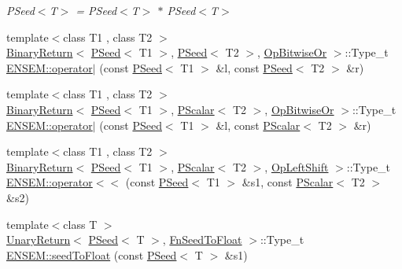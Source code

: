 \begin{DoxyCompactItemize}
\begin{DoxyCompactList}\small\item\em P\+Seed$<$\+T$>$ = P\+Seed$<$\+T$>$ $\ast$ P\+Seed$<$\+T$>$ \end{DoxyCompactList}\item 
{\footnotesize template$<$class T1 , class T2 $>$ }\\\mbox{\hyperlink{structENSEM_1_1BinaryReturn}{Binary\+Return}}$<$ \mbox{\hyperlink{classENSEM_1_1PSeed}{P\+Seed}}$<$ T1 $>$, \mbox{\hyperlink{classENSEM_1_1PSeed}{P\+Seed}}$<$ T2 $>$, \mbox{\hyperlink{structENSEM_1_1OpBitwiseOr}{Op\+Bitwise\+Or}} $>$\+::Type\+\_\+t \mbox{\hyperlink{group__primseed_gafffac24485a71eb45df5a8073ab12746}{E\+N\+S\+E\+M\+::operator$\vert$}} (const \mbox{\hyperlink{classENSEM_1_1PSeed}{P\+Seed}}$<$ T1 $>$ \&l, const \mbox{\hyperlink{classENSEM_1_1PSeed}{P\+Seed}}$<$ T2 $>$ \&r)
\item 
{\footnotesize template$<$class T1 , class T2 $>$ }\\\mbox{\hyperlink{structENSEM_1_1BinaryReturn}{Binary\+Return}}$<$ \mbox{\hyperlink{classENSEM_1_1PSeed}{P\+Seed}}$<$ T1 $>$, \mbox{\hyperlink{classENSEM_1_1PScalar}{P\+Scalar}}$<$ T2 $>$, \mbox{\hyperlink{structENSEM_1_1OpBitwiseOr}{Op\+Bitwise\+Or}} $>$\+::Type\+\_\+t \mbox{\hyperlink{group__primseed_ga65b26c68c77d19a64ae5896efce8b37c}{E\+N\+S\+E\+M\+::operator$\vert$}} (const \mbox{\hyperlink{classENSEM_1_1PSeed}{P\+Seed}}$<$ T1 $>$ \&l, const \mbox{\hyperlink{classENSEM_1_1PScalar}{P\+Scalar}}$<$ T2 $>$ \&r)
\item 
{\footnotesize template$<$class T1 , class T2 $>$ }\\\mbox{\hyperlink{structENSEM_1_1BinaryReturn}{Binary\+Return}}$<$ \mbox{\hyperlink{classENSEM_1_1PSeed}{P\+Seed}}$<$ T1 $>$, \mbox{\hyperlink{classENSEM_1_1PScalar}{P\+Scalar}}$<$ T2 $>$, \mbox{\hyperlink{structENSEM_1_1OpLeftShift}{Op\+Left\+Shift}} $>$\+::Type\+\_\+t \mbox{\hyperlink{group__primseed_ga2c9462b410a1897e81847c2ca630c0fd}{E\+N\+S\+E\+M\+::operator$<$$<$}} (const \mbox{\hyperlink{classENSEM_1_1PSeed}{P\+Seed}}$<$ T1 $>$ \&s1, const \mbox{\hyperlink{classENSEM_1_1PScalar}{P\+Scalar}}$<$ T2 $>$ \&s2)
\item 
{\footnotesize template$<$class T $>$ }\\\mbox{\hyperlink{structENSEM_1_1UnaryReturn}{Unary\+Return}}$<$ \mbox{\hyperlink{classENSEM_1_1PSeed}{P\+Seed}}$<$ T $>$, \mbox{\hyperlink{structENSEM_1_1FnSeedToFloat}{Fn\+Seed\+To\+Float}} $>$\+::Type\+\_\+t \mbox{\hyperlink{group__primseed_gace5eb402052ee22e28bfd72ab7e92194}{E\+N\+S\+E\+M\+::seed\+To\+Float}} (const \mbox{\hyperlink{classENSEM_1_1PSeed}{P\+Seed}}$<$ T $>$ \&s1)

\end{DoxyCompactItemize}
